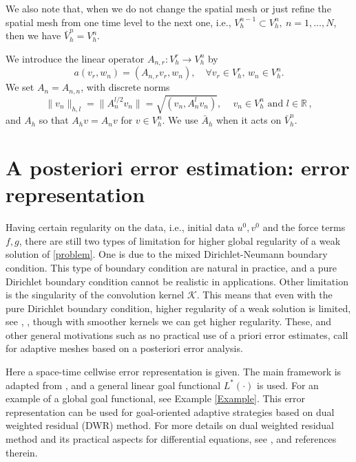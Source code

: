 \documentclass{amsart}
\numberwithin{equation}{section}
\theoremstyle{definition}
\begin{document}
We also note that, when we do not change the spatial mesh or just refine the
spatial mesh from one time level to the next one, i.e., 
$  V_h^{n-1}\subset V_h^n,\ n=1,\dots,N$, 
then we have $\bar V_h^n=V_h^n$. 

We introduce the linear operator
$A_{n,r}:V_h^r\to V_h^n$ by
\begin{equation*}
  a(v_r,w_n)
   =(A_{n,r}v_r,w_n),\quad\forall v_r\in V_h^r,
    \,w_n \in V_h^n.
\end{equation*}
We set $A_n=A_{n,n}$, with discrete norms
\begin{equation*}
  \| v_n\|_{h,l}=\| A_{n}^{l/2} v_n\|
     =\sqrt{(v_n,A_n^l v_n)},\,\quad v_n\in V_h^n\,\,
       \textrm{and}\,\, l\in \mathbb{R}\,,
\end{equation*}
and $A_h$ so that $A_h v=A_n v$ for $v \in V_h^n$.
We use $\bar A_h$ when it acts on $\bar V_h^n$.
\section{{\bf A posteriori error estimation: error representation}}
Having certain regularity on the data, i.e., initial data $u^0,v^0$
and the force terms $f,g$, there are still two types of limitation
for higher global regularity of a weak solution of \eqref{problem}.
One is due to the mixed Dirichlet-Neumann boundary condition.
This type of boundary condition are natural in practice, and a pure
Dirichlet boundary condition cannot be realistic in applications.
Other limitation is the singularity of the convolution kernel ${\mathcal K}$.
This means that even with the pure Dirichlet boundary condition, higher
regularity of a weak solution is limited, 
see \cite{StigFardin}, \cite{FardinarXiv:1203.4001},
though with smoother kernels we can get higher regularity.
These, and other general motivations such as no practical use of
a priori error estimates, call for adaptive meshes based on
a posteriori error analysis.

Here a space-time cellwise error representation is given.
The main framework is adapted from \cite{BangerthRannacher:Book}, and
a general linear goal functional $L^*(\cdot)$ is used. 
For an example of a global goal functional, see Example \ref{Example}. 
This error representation can be used for goal-oriented
adaptive strategies based on dual weighted residual (DWR) method. 
For more details on dual weighted residual method and
its practical aspects for differential equations,
see \cite{BangerthGeigerRannacher}, 
\cite{BangerthRannacher:Book} and references therein.
\end{document}
